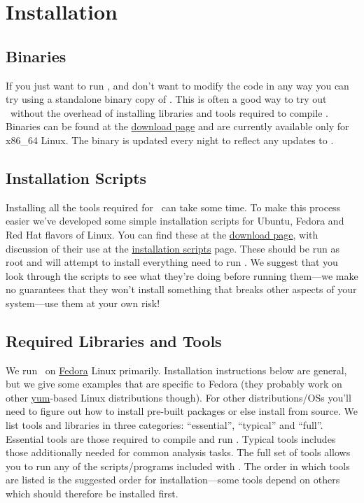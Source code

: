 \chapter{Installation}

\section{Binaries}

If you just want to run \glc, and don't want to modify the code in any way you can try using a standalone binary copy of \glc. This is often a good way to try out \glc\ without the overhead of installing libraries and tools required to compile \glc. Binaries can be found at the \href{https://sites.google.com/site/galacticusmodel/downloads}{download page} and are currently available only for x86\_64 Linux. The binary is updated every night to reflect any updates to \glc.

\section{Installation Scripts}

Installing all the tools required for \glc\ can take some time. To make this process easier we've developed some simple installation scripts for Ubuntu, Fedora and Red Hat flavors of Linux. You can find these at the \href{https://sites.google.com/site/galacticusmodel/downloads}{download page}, with discussion of their use at the \href{https://sites.google.com/site/galacticusmodel/downloads/installtion-scripts}{installation scripts} page. These should be run as root and will attempt to install everything need to run \glc. We suggest that you look through the scripts to see what they're doing before running them---we make no guarantees that they won't install something that breaks other aspects of your system---use them at your own risk!

\section{Required Libraries and Tools}

We run \glc\ on \href{http://fedoraproject.org/}{Fedora} Linux primarily. Installation instructions below are general, but we give some examples that are specific to Fedora (they probably work on other \href{http://yum.baseurl.org/}{{\normalfont \ttfamily yum}}-based Linux distributions though). For other distributions/OSs you'll need to figure out how to install pre-built packages or else install from source. We list tools and libraries in three categories: ``essential'', ``typical'' and ``full''. Essential tools are those required to compile and run \glc. Typical tools includes those additionally needed for common analysis tasks. The full set of tools allows you to run any of the scripts/programs included with \glc. The order in which tools are listed is the suggested order for installation---some tools depend on others which should therefore be installed first.

